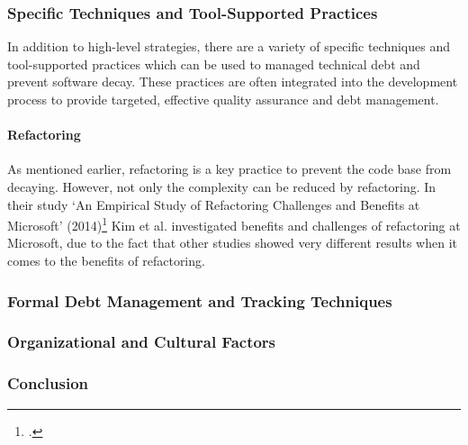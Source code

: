 \subsubsection{Specific Techniques and Tool-Supported Practices}
In addition to high-level strategies, there are a variety of specific techniques and tool-supported practices which can be used to managed technical debt 
and prevent software decay. These practices are often integrated into the development process to provide targeted, effective quality assurance and debt management.\\
\paragraph{Refactoring}
As mentioned earlier, refactoring is a key practice to prevent the code base from decaying. However, not only the complexity can be reduced by refactoring.
In their study `An Empirical Study of Refactoring Challenges and Benefits at Microsoft' (2014)\footcite{kimEmpiricalStudyRefactoringChallenges2014} Kim et al.
investigated benefits and challenges of refactoring at Microsoft, due to the fact that other studies showed very different results when it comes to the benefits of refactoring.



\subsubsection{Formal Debt Management and Tracking Techniques}
\subsubsection{Organizational and Cultural Factors}
\subsubsection{Conclusion}





